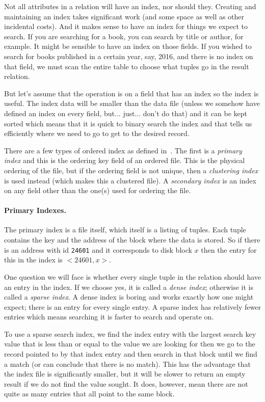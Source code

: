 \documentclass[a4paper]{report}
\begin{document}
Not all attributes in a relation will have an index, nor should they. Creating and maintaining an index takes significant work (and some space as well as other incidental costs). And it makes sense to have an index for things we expect to search. If you are searching for a book, you can search by title or author, for example. It might be sensible to have an index on those fields. If you wished to search for books published in a certain year, say, 2016, and there is no index on that field, we must scan the entire table to choose what tuples go in the result relation.

But let's assume that the operation is on a field that has an index so the index is useful. The index data will be smaller than the data file (unless we somehow have defined an index on every field, but... just... don't do that) and it can be kept sorted which means that it is quick to binary search the index and that tells us efficiently where we need to go to get to the desired record.

There are a few types of ordered index as defined in~\cite{fds}. The first is a \textit{primary index} and this is the ordering key field of an ordered file. This is the physical ordering of the file, but if the ordering field is not unique, then a \textit{clustering index} is used instead (which makes this a clustered file). A \textit{secondary index} is an index on any field other than the one(s) used for ordering the file.

\paragraph{Primary Indexes.}
The primary index is a file itself, which itself is a listing of tuples. Each tuple contains the key and the address of the block where the data is stored. So if there is an address with id \texttt{24601} and it corresponds to disk block $x$ then the entry for this in the index is $<24601, x>$. 

One question we will face is whether every single tuple in the relation should have an entry in the index. If we choose yes, it is called a \textit{dense index}; otherwise it is called a \textit{sparse index}. A dense index is boring and works exactly how one might expect; there is an entry for every single entry. A sparse index has relatively fewer entries which means searching it is faster to search and operate on. 

To use a sparse search index, we find the index entry with the largest search key value that is less than or equal to the value we are looking for then we go to the record pointed to by that index entry and then search in that block until we find a match (or can conclude that there is no match). This has the advantage that the index file is significantly smaller, but it will be slower to return an empty result if we do not find the value sought. It does, however, mean there are not quite as many entries that all point to the same block.
\end{document}
